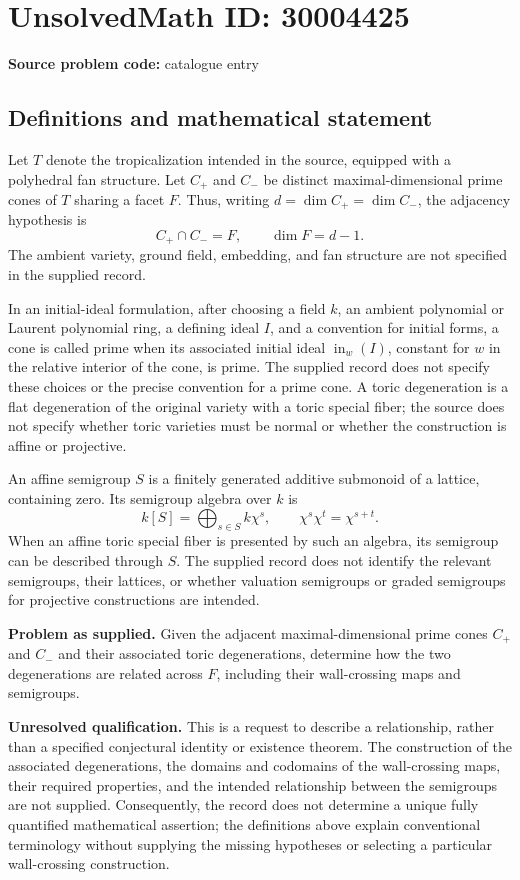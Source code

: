 \documentclass[11pt]{article}
\begin{document}
\section*{UnsolvedMath ID: 30004425}
\textbf{Source problem code:} catalogue entry
\subsection{Definitions and mathematical statement}
Let \(T\) denote the tropicalization intended in the source, equipped with a polyhedral fan structure. Let \(C_+\) and \(C_-\) be distinct maximal-dimensional prime cones of \(T\) sharing a facet \(F\). Thus, writing \(d=\dim C_+=\dim C_-\), the adjacency hypothesis is
\[
C_+\cap C_-=F,\qquad \dim F=d-1.
\]
The ambient variety, ground field, embedding, and fan structure are not specified in the supplied record.

In an initial-ideal formulation, after choosing a field \(k\), an ambient polynomial or Laurent polynomial ring, a defining ideal \(I\), and a convention for initial forms, a cone is called prime when its associated initial ideal \(\operatorname{in}_w(I)\), constant for \(w\) in the relative interior of the cone, is prime. The supplied record does not specify these choices or the precise convention for a prime cone. A toric degeneration is a flat degeneration of the original variety with a toric special fiber; the source does not specify whether toric varieties must be normal or whether the construction is affine or projective.

An affine semigroup \(S\) is a finitely generated additive submonoid of a lattice, containing zero. Its semigroup algebra over \(k\) is
\[
k[S]=\bigoplus_{s\in S}k\chi^s,
\qquad \chi^s\chi^t=\chi^{s+t}.
\]
When an affine toric special fiber is presented by such an algebra, its semigroup can be described through \(S\). The supplied record does not identify the relevant semigroups, their lattices, or whether valuation semigroups or graded semigroups for projective constructions are intended.

\textbf{Problem as supplied.} Given the adjacent maximal-dimensional prime cones \(C_+\) and \(C_-\) and their associated toric degenerations, determine how the two degenerations are related across \(F\), including their wall-crossing maps and semigroups.

\textbf{Unresolved qualification.} This is a request to describe a relationship, rather than a specified conjectural identity or existence theorem. The construction of the associated degenerations, the domains and codomains of the wall-crossing maps, their required properties, and the intended relationship between the semigroups are not supplied. Consequently, the record does not determine a unique fully quantified mathematical assertion; the definitions above explain conventional terminology without supplying the missing hypotheses or selecting a particular wall-crossing construction.
\end{document}

